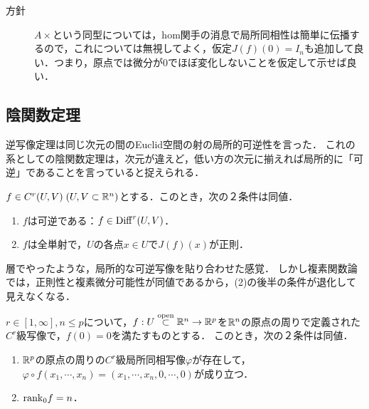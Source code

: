 \documentclass[uplatex,dvipdfmx]{jsreport}
\begin{document}
\begin{remarks}\mbox{}
    \begin{description}
        \item[方針] $A\times$という同型については，hom関手の消息で局所同相性は簡単に伝播するので，これについては無視してよく，仮定$J(f)(0)=I_n$も追加して良い．つまり，原点では微分が$0$でほぼ変化しないことを仮定して示せば良い．
        \item[] 
    \end{description}
\end{remarks}

\subsection{陰関数定理}

\begin{tcolorbox}[colframe=ForestGreen, colback=ForestGreen!10!white,breakable,colbacktitle=ForestGreen!40!white,coltitle=black,fonttitle=\bfseries\sffamily,
title=逆関数定理の系としての陰関数定理]
    逆写像定理は同じ次元の間のEuclid空間の射の局所的可逆性を言った．
    これの系としての陰関数定理は，次元が違えど，低い方の次元に揃えれば局所的に「可逆」であることを言っていると捉えられる．
\end{tcolorbox}

\begin{corollary}
    $f\in C^r(U,V)\;(U,V\subset\mathbb{R}^n)$とする．このとき，次の２条件は同値．
    \begin{enumerate}
        \item $f$は可逆である：$f\in\mathrm{Diff}^r(U,V)$．
        \item $f$は全単射で，$U$の各点$x\in U$で$J(f)(x)$が正則．
    \end{enumerate}
\end{corollary}
\begin{remarks}
    層でやったような，局所的な可逆写像を貼り合わせた感覚．
    しかし複素関数論では，正則性と複素微分可能性が同値であるから，(2)の後半の条件が退化して見えなくなる．
\end{remarks}

\begin{corollary}[陰関数定理]\label{cor-implicit-function}
    $r\in[1,\infty],n\le p$について，$f:U\overset{\mathrm{open}}{\subset}\mathbb{R}^n\to\mathbb{R}^p$を$\mathbb{R}^n$の原点の周りで定義された$C^r$級写像で，$f(0)=0$を満たすものとする．
    このとき，次の２条件は同値．
    \begin{enumerate}
        \item $\mathbb{R}^p$の原点の周りの$C^r$級局所同相写像$\varphi$が存在して，$\varphi\circ f(x_1,\cdots,x_n)=(x_1,\cdots,x_n,0,\cdots,0)$が成り立つ．
        \item $\mathrm{rank}_0f=n$．
    \end{enumerate}
\end{corollary}
\end{document}

